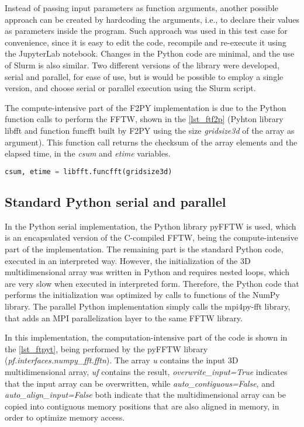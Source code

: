 Instead of passing input parameters as function arguments, another possible approach can be created by hardcoding the arguments, i.e., to declare their values as parameters inside the program. Such approach was used in this test case for convenience, since it is easy to edit the code, recompile and re-execute it using the JupyterLab notebook. Changes in the Python code are minimal, and the use of Slurm is also similar. Two different versions of the library were developed, serial and parallel, for ease of use, but is would be possible to employ a single version, and choose serial or parallel execution using the Slurm script. 

The compute-intensive part of the F2PY implementation is due to the Python function calls to perform the FFTW, shown in the \autoref {lst_ftf2p} (Pyhton library libfft and function funcfft built by F2PY using the size \textit {gridsize3d} of the array as argument). This function call returns the checksum of the array elements and the elapsed time, in the \textit {csum} and \textit {etime} variables. 

\begin{lstlisting}[float=hbt, language=Python, label={lst_ftf2p}, caption={Compute-intensive part of the FFT test case Python code.}]
csum, etime = libfft.funcfft(gridsize3d)
\end{lstlisting}

%
%
%
\subsection{Standard Python serial and parallel} %
\label{sec_fftimplpy}

In the Python serial implementation, the Python library pyFFTW is used, which is an encapsulated version of the C-compiled FFTW, being the compute-intensive part of the implementation. The remaining part is the standard Python code, executed in an interpreted way. However, the initialization of the 3D multidimensional array was written in Python and requires nested loops, which are very slow when executed in interpreted form. Therefore, the Python code that performs the initialization was optimized by calls to functions of the NumPy library. 
The parallel Python implementation simply calls the mpi4py-fft library, that adds an MPI parallelization layer to the same FFTW library.

In this implementation, the computation-intensive part of the code is shown in the \autoref {lst_ftpyt}, being performed by the pyFFTW library (\textit {pf.interfaces.numpy\_fft.fftn}). The array \textit {u} contains the input 3D multidimensional array, \textit {uf} contains the result, \textit {overwrite\_input=True} indicates that the input array can be overwritten, while \textit {auto\_contiguous=False}, and \textit {auto\_align\_input=False} both indicate that the multidimensional array can be copied into contiguous memory positions that are also aligned in memory, in order to optimize memory access. 


